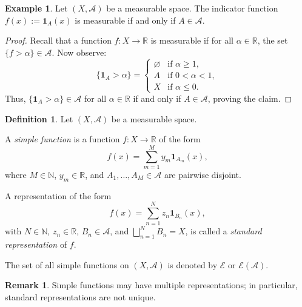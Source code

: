 \documentclass[12pt]{article}
\theoremstyle{definition}
\newtheorem{definition}{Definition}[section]
\newtheorem{example}{Example}[section]
\newtheorem{remark}{Remark}[section]
\begin{document}
\medskip
\begin{example}
Let \( (X, \mathcal{A}) \) be a measurable space.  
The indicator function \( f(x) := \mathbf{1}_A(x) \) is measurable if and only if \( A \in \mathcal{A} \).

\begin{proof}
Recall that a function \( f : X \to \mathbb{R} \) is measurable if for all \( \alpha \in \mathbb{R} \), the set \( \{ f > \alpha \} \in \mathcal{A} \).  
Now observe:
\[
\{ \mathbf{1}_A > \alpha \} =
\begin{cases}
\varnothing & \text{if } \alpha \geq 1, \\
A & \text{if } 0 < \alpha < 1, \\
X & \text{if } \alpha \leq 0.
\end{cases}
\]
Thus, \( \{ \mathbf{1}_A > \alpha \} \in \mathcal{A} \) for all \( \alpha \in \mathbb{R} \) if and only if \( A \in \mathcal{A} \), proving the claim.
\end{proof}
\end{example}

\medskip
\begin{definition}
Let \( (X, \mathcal{A}) \) be a measurable space.

A \emph{simple function} is a function \( f : X \to \mathbb{R} \) of the form
\[
f(x) = \sum_{m=1}^{M} y_m \mathbf{1}_{A_m}(x),
\]
where \( M \in \mathbb{N} \), \( y_m \in \mathbb{R} \), and \( A_1, \dots, A_M \in \mathcal{A} \) are pairwise disjoint.

A representation of the form
\[
f(x) = \sum_{n=1}^{N} z_n \mathbf{1}_{B_n}(x),
\]
with \( N \in \mathbb{N} \), \( z_n \in \mathbb{R} \), \( B_n \in \mathcal{A} \), and \( \bigsqcup_{n=1}^N B_n = X \), is called a \emph{standard representation} of \( f \).

The set of all simple functions on \( (X, \mathcal{A}) \) is denoted by \( \mathcal{E} \) or \( \mathcal{E}(\mathcal{A}) \).
\end{definition}

\begin{remark}
Simple functions may have multiple representations; in particular, standard representations are not unique.
\end{remark}
\end{document}
